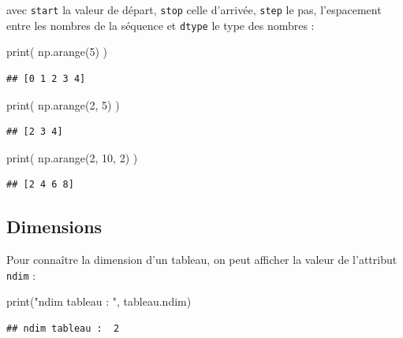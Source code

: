 \documentclass[12pt,]{book}
\newenvironment{Shaded}{\begin{snugshade}}{\end{snugshade}}
\newcommand{\DecValTok}[1]{\textcolor[rgb]{0.00,0.00,0.81}{#1}}
\newcommand{\StringTok}[1]{\textcolor[rgb]{0.31,0.60,0.02}{#1}}
\newcommand{\BuiltInTok}[1]{#1}
\newcommand{\NormalTok}[1]{#1}
\numberwithin{equation}{section}
\numberwithin{countremarque}{section}
\begin{document}
avec \texttt{start} la valeur de départ, \texttt{stop} celle d'arrivée,
\texttt{step} le pas, l'espacement entre les nombres de la séquence et
\texttt{dtype} le type des nombres :

\begin{Shaded}
\begin{Highlighting}[]
\BuiltInTok{print}\NormalTok{( np.arange(}\DecValTok{5}\NormalTok{) )}
\end{Highlighting}
\end{Shaded}

\begin{lstlisting}
## [0 1 2 3 4]
\end{lstlisting}

\begin{Shaded}
\begin{Highlighting}[]
\BuiltInTok{print}\NormalTok{( np.arange(}\DecValTok{2}\NormalTok{, }\DecValTok{5}\NormalTok{) )}
\end{Highlighting}
\end{Shaded}

\begin{lstlisting}
## [2 3 4]
\end{lstlisting}

\begin{Shaded}
\begin{Highlighting}[]
\BuiltInTok{print}\NormalTok{( np.arange(}\DecValTok{2}\NormalTok{, }\DecValTok{10}\NormalTok{, }\DecValTok{2}\NormalTok{) )}
\end{Highlighting}
\end{Shaded}

\begin{lstlisting}
## [2 4 6 8]
\end{lstlisting}

\subsection{Dimensions}\label{dimensions}

Pour connaître la dimension d'un tableau, on peut afficher la valeur de
l'attribut \texttt{ndim} :

\begin{Shaded}
\begin{Highlighting}[]
\BuiltInTok{print}\NormalTok{(}\StringTok{"ndim tableau : "}\NormalTok{, tableau.ndim)}
\end{Highlighting}
\end{Shaded}

\begin{lstlisting}
## ndim tableau :  2
\end{lstlisting}
\end{document}

